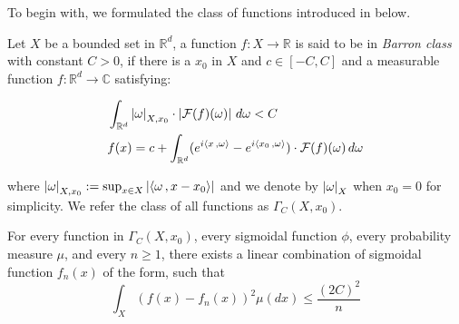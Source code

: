 To begin with, we formulated the class of functions introduced in
\cite{barronNeuralNetApproximation1992, barronUniversalApproximationBounds1993}
below.

\begin{definition}
    \label{def:fourier_class}
    Let $X$ be a bounded set in $\mathbb{R}^d$, a function $f: X \to \mathbb{R}$
    is said to be in \textit{Barron class} with constant $C > 0$, if there is a
    $x_0$ in $X$ and $c \in [-C, C]$ and a measurable function $f: \mathbb{R}^d
    \to \mathbb{C}$ satisfying:

    \begin{align}
         & \int_{\mathbb{R}^d} \left| \omega \right|_{X, x_0} \cdot \left| \mathcal{F}(f)(\omega) \right| \,d\omega < C                            \\
         & f(x) = c + \int_{\mathbb{R}^d} (e^{i\left\langle x\, , \omega \right\rangle} - e^{i\left\langle x_0\, , \omega \right\rangle}) \cdot \mathcal{F}(f)(\omega)\,d\omega
    \end{align}

    where $\left| \omega \right|_{X, x_0} := \sup_{x\in X}\left| \left\langle \omega\, , x - x_0 \right\rangle \right|$
    and we denote by $\left| \omega \right|_X$ when $x_0 = 0$ for simplicity. We refer
    the class of all functions as $\Gamma_C(X, x_0)$.
\end{definition}

\begin{theorem}\cite[Theorem~1]{barronUniversalApproximationBounds1993}\label{thm:barron_1993_1}
    For every function in $\Gamma_C(X, x_0)$, every sigmoidal function $\phi$,
    every probability measure $\mu$, and every $n \geq 1$, there exists a linear
    combination of sigmoidal function $f_n(x)$ of the form, such that
    \begin{equation}
        \int_X(f(x) - f_n(x))^2 \mu(dx) \leq \frac{(2C)^2}{n}
    \end{equation}
\end{theorem}


